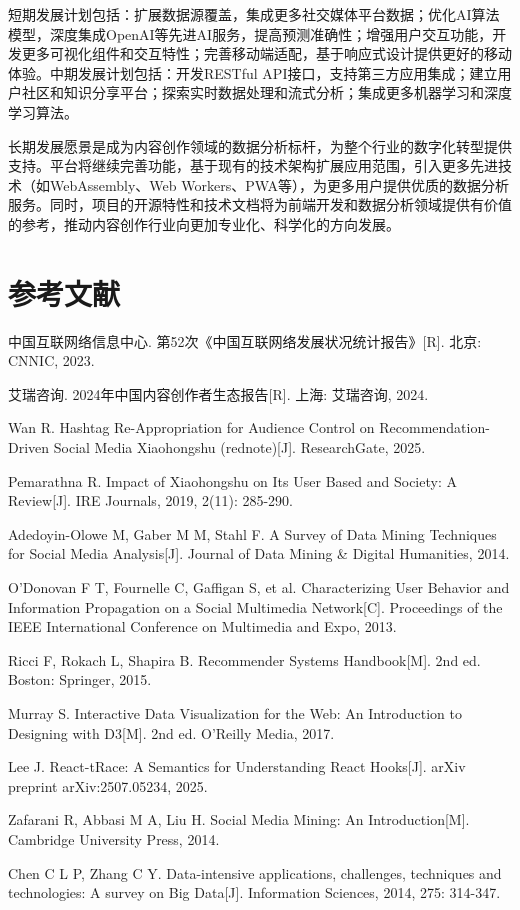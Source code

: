 \documentclass[12pt,a4paper]{article}
\begin{document}
短期发展计划包括：扩展数据源覆盖，集成更多社交媒体平台数据；优化AI算法模型，深度集成OpenAI等先进AI服务，提高预测准确性；增强用户交互功能，开发更多可视化组件和交互特性；完善移动端适配，基于响应式设计提供更好的移动体验。中期发展计划包括：开发RESTful API接口，支持第三方应用集成；建立用户社区和知识分享平台；探索实时数据处理和流式分析；集成更多机器学习和深度学习算法。

长期发展愿景是成为内容创作领域的数据分析标杆，为整个行业的数字化转型提供支持。平台将继续完善功能，基于现有的技术架构扩展应用范围，引入更多先进技术（如WebAssembly、Web Workers、PWA等），为更多用户提供优质的数据分析服务。同时，项目的开源特性和技术文档将为前端开发和数据分析领域提供有价值的参考，推动内容创作行业向更加专业化、科学化的方向发展。

\section*{参考文献}

\begin{thebibliography}{99}

中国互联网络信息中心. 第52次《中国互联网络发展状况统计报告》[R]. 北京: CNNIC, 2023.

艾瑞咨询. 2024年中国内容创作者生态报告[R]. 上海: 艾瑞咨询, 2024.

Wan R. Hashtag Re-Appropriation for Audience Control on Recommendation-Driven Social Media Xiaohongshu (rednote)[J]. ResearchGate, 2025.

Pemarathna R. Impact of Xiaohongshu on Its User Based and Society: A Review[J]. IRE Journals, 2019, 2(11): 285-290.

Adedoyin-Olowe M, Gaber M M, Stahl F. A Survey of Data Mining Techniques for Social Media Analysis[J]. Journal of Data Mining \& Digital Humanities, 2014.

O'Donovan F T, Fournelle C, Gaffigan S, et al. Characterizing User Behavior and Information Propagation on a Social Multimedia Network[C]. Proceedings of the IEEE International Conference on Multimedia and Expo, 2013.

Ricci F, Rokach L, Shapira B. Recommender Systems Handbook[M]. 2nd ed. Boston: Springer, 2015.

Murray S. Interactive Data Visualization for the Web: An Introduction to Designing with D3[M]. 2nd ed. O'Reilly Media, 2017.

Lee J. React-tRace: A Semantics for Understanding React Hooks[J]. arXiv preprint arXiv:2507.05234, 2025.

Zafarani R, Abbasi M A, Liu H. Social Media Mining: An Introduction[M]. Cambridge University Press, 2014.

Chen C L P, Zhang C Y. Data-intensive applications, challenges, techniques and technologies: A survey on Big Data[J]. Information Sciences, 2014, 275: 314-347.

\end{thebibliography}
\end{document}
